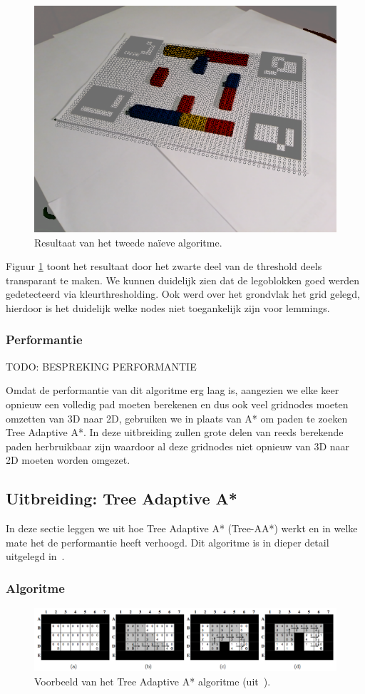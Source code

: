 \begin{figure}
  \centering
  \includegraphics[width=.5\linewidth]{img/alg2}
  \caption{Resultaat van het tweede na\"ieve algoritme.}
  \label{fig:algo2_res}
\end{figure}

Figuur \ref{fig:algo2_res} toont het resultaat door het zwarte deel van de threshold deels transparant te maken. We kunnen duidelijk zien dat de legoblokken goed werden gedetecteerd via kleurthresholding. Ook werd over het grondvlak het grid gelegd, hierdoor is het duidelijk welke nodes niet toegankelijk zijn voor lemmings.

\subsubsection*{Performantie}
TODO: BESPREKING PERFORMANTIE

Omdat de performantie van dit algoritme erg laag is, aangezien we elke keer opnieuw een volledig pad moeten berekenen en dus ook veel gridnodes moeten omzetten van 3D naar 2D, gebruiken we in plaats van A* om paden te zoeken Tree Adaptive A*. In deze uitbreiding zullen grote delen van reeds berekende paden herbruikbaar zijn waardoor al deze gridnodes niet opnieuw van 3D naar 2D moeten worden omgezet.
 
\subsection{Uitbreiding: Tree Adaptive A*}

In deze sectie leggen we uit hoe Tree Adaptive A* (Tree-AA*) werkt en in welke mate het de performantie heeft verhoogd. Dit algoritme is in dieper detail uitgelegd in~\cite{hernandez2011tree}.

\subsubsection*{Algoritme}

\begin{figure}
  \centering
  \includegraphics[width=\linewidth]{img/TAAStar}
  \caption{Voorbeeld van het Tree Adaptive A* algoritme (uit~\cite{hernandez2011tree}).}
  \label{fig:taastar}
\end{figure}

